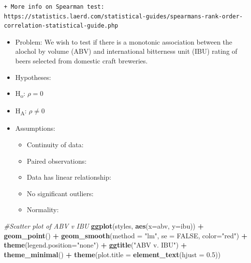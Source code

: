 \documentclass[]{article}
\newenvironment{Shaded}{\begin{snugshade}}{\end{snugshade}}
\newcommand{\KeywordTok}[1]{\textcolor[rgb]{0.13,0.29,0.53}{\textbf{#1}}}
\newcommand{\DataTypeTok}[1]{\textcolor[rgb]{0.13,0.29,0.53}{#1}}
\newcommand{\FloatTok}[1]{\textcolor[rgb]{0.00,0.00,0.81}{#1}}
\newcommand{\StringTok}[1]{\textcolor[rgb]{0.31,0.60,0.02}{#1}}
\newcommand{\CommentTok}[1]{\textcolor[rgb]{0.56,0.35,0.01}{\textit{#1}}}
\newcommand{\OtherTok}[1]{\textcolor[rgb]{0.56,0.35,0.01}{#1}}
\newcommand{\OperatorTok}[1]{\textcolor[rgb]{0.81,0.36,0.00}{\textbf{#1}}}
\newcommand{\NormalTok}[1]{#1}
\providecommand{\tightlist}{%
  \setlength{\itemsep}{0pt}\setlength{\parskip}{0pt}}
\newcommand{\cmark}{\Large\textcolor{green}{\ding{52}}}
\newcommand{\xmark}{\Large\textcolor{red}{\ding{55}}}
\begin{document}
\begin{verbatim}
+ More info on Spearman test: https://statistics.laerd.com/statistical-guides/spearmans-rank-order-correlation-statistical-guide.php
\end{verbatim}

\begin{itemize}
\item
  Problem: We wish to test if there is a monotonic association between
  the alochol by volume (ABV) and international bitterness unit (IBU)
  rating of beers selected from domestic craft breweries.
\item
  Hypotheses:
\item
  H\textsubscript{o}: \(\rho= 0\)
\item
  H\textsubscript{A}: \(\rho\neq 0\)
\item
  Assumptions:

  \begin{itemize}
  \tightlist
  \item
    Continuity of data: \cmark
  \item
    Paired observations: \cmark
  \item
    Data has linear relationship: \cmark
  \item
    No significant outliers: \xmark
  \item
    Normality: \xmark
  \end{itemize}
\end{itemize}

\begin{Shaded}
\begin{Highlighting}[]
\CommentTok{#Scatter plot of ABV v IBU}
\KeywordTok{ggplot}\NormalTok{(styles, }\KeywordTok{aes}\NormalTok{(}\DataTypeTok{x=}\NormalTok{abv, }\DataTypeTok{y=}\NormalTok{ibu)) }\OperatorTok{+}
\StringTok{  }\KeywordTok{geom_point}\NormalTok{() }\OperatorTok{+}
\StringTok{  }\KeywordTok{geom_smooth}\NormalTok{(}\DataTypeTok{method =} \StringTok{"lm"}\NormalTok{, }\DataTypeTok{se =} \OtherTok{FALSE}\NormalTok{, }\DataTypeTok{color=}\StringTok{"red"}\NormalTok{) }\OperatorTok{+}
\StringTok{  }\KeywordTok{theme}\NormalTok{(}\DataTypeTok{legend.position=}\StringTok{"none"}\NormalTok{) }\OperatorTok{+}
\StringTok{  }\KeywordTok{ggtitle}\NormalTok{(}\StringTok{"ABV v. IBU"}\NormalTok{) }\OperatorTok{+}
\StringTok{  }\KeywordTok{theme_minimal}\NormalTok{()  }\OperatorTok{+}
\StringTok{  }\KeywordTok{theme}\NormalTok{(}\DataTypeTok{plot.title =} \KeywordTok{element_text}\NormalTok{(}\DataTypeTok{hjust =} \FloatTok{0.5}\NormalTok{))}
\end{Highlighting}
\end{Shaded}
\end{document}
